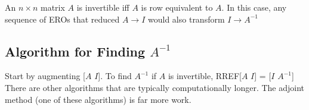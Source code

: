 \documentclass{report}
\begin{document}
\begin{theorem}
An $n\times n$ matrix $A$ is invertible iff $A$ is row equivalent to $A$. In this case, any sequence of EROs that reduced $A\rightarrow I$ would also transform $I\rightarrow A^{-1}$
\end{theorem}

\subsection*{Algorithm for Finding $A^{-1}$}
Start by augmenting [$A$ $I$]. To find $A^{-1}$ if $A$ is invertible, RREF[$A$ $I$] = [$I$ $A^{-1}$]\\

There are other algorithms that are typically computationally longer. The adjoint method (one of these algorithms) is far more work.
\end{document}
